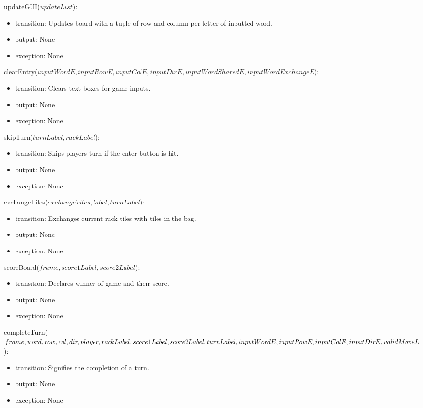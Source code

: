 \documentclass[12pt]{article}
\begin{document}
\noindent updateGUI($updateList$):
\begin{itemize}
\item transition: Updates board with a tuple of row and column per letter of inputted word.
\item output: None
\item exception: None
\end{itemize}

\noindent clearEntry($inputWordE, inputRowE, inputColE, inputDirE,inputWordSharedE, inputWordExchangeE$):
\begin{itemize}
\item transition: Clears text boxes for game inputs.
\item output: None
\item exception: None
\end{itemize}

\noindent skipTurn($turnLabel, rackLabel$):
\begin{itemize}
\item transition: Skips players turn if the enter button is hit.
\item output: None
\item exception: None
\end{itemize}

\noindent exchangeTiles($exchangeTiles, label, turnLabel$):
\begin{itemize}
\item transition: Exchanges current rack tiles with tiles in the bag.
\item output: None
\item exception: None
\end{itemize}

\noindent scoreBoard($frame, score1Label, score2Label$):
\begin{itemize}
\item transition: Declares winner of game and their score.
\item output: None
\item exception: None
\end{itemize}

\noindent completeTurn($frame, word, row, col, dir, player, rackLabel, score1Label,\\ score2Label, turnLabel, inputWordE, inputRowE, inputColE,\\ inputDirE, validMoveL$):
\begin{itemize}
\item transition: Signifies the completion of a turn.
\item output: None
\item exception: None
\end{itemize}
\end{document}
